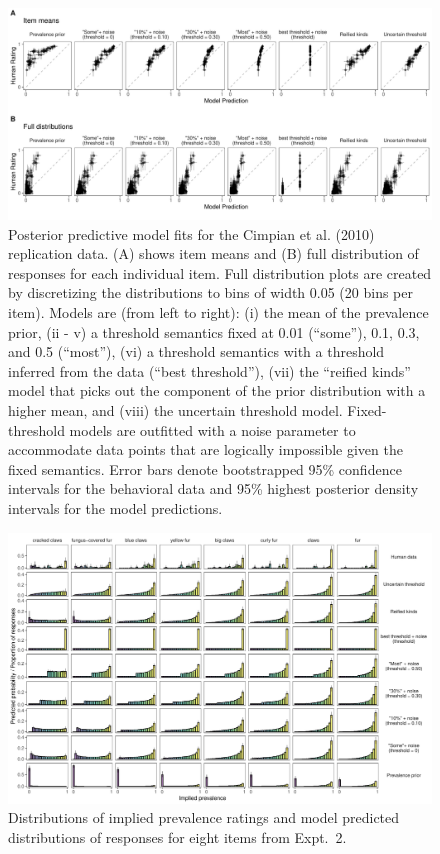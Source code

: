 \documentclass[floatsintext,doc]{apa6}
\begin{document}
\begin{figure}
\centering
\includegraphics{figs/cimpian-modelingResults-plotgrid-scatters.pdf}
\caption{\label{fig:cimpian-modelingResults-scatters}Posterior predictive model fits for the Cimpian et al. (2010) replication data. (A) shows item means and (B) full distribution of responses for each individual item. Full distribution plots are created by discretizing the distributions to bins of width 0.05 (20 bins per item). Models are (from left to right): (i) the mean of the prevalence prior, (ii - v) a threshold semantics fixed at 0.01 (\enquote{some}), 0.1, 0.3, and 0.5 (``most''), (vi) a threshold semantics with a threshold inferred from the data (``best threshold''), (vii) the ``reified kinds'' model that picks out the component of the prior distribution with a higher mean, and (viii) the uncertain threshold model. Fixed-threshold models are outfitted with a noise parameter to accommodate data points that are logically impossible given the fixed semantics. Error bars denote bootstrapped 95\% confidence intervals for the behavioral data and 95\% highest posterior density intervals for the model predictions.}
\end{figure}


\begin{figure}
\centering
\includegraphics{figs/cimpian-fullDistributions-variousFixeds-1.pdf}
\caption{Distributions of implied prevalence ratings and model predicted distributions of responses for eight items from Expt.~2.
}
\label{fig:cimpian-modelingResults-bars}
\end{figure}
\end{document}
